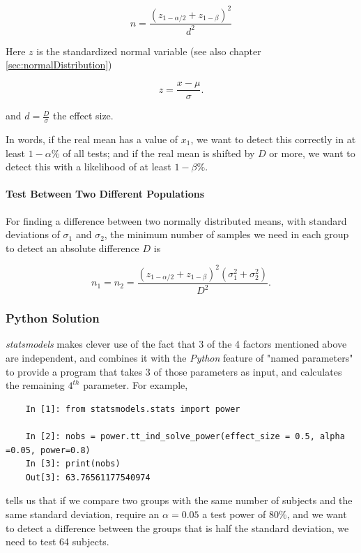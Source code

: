 \begin{equation}
  n = \frac{{({z_{1 - \alpha /2}} + {z_{1 - \beta }})}^2}{d^2}
\end{equation}

Here $z$ is the standardized normal variable (see also chapter \ref{sec:normalDistribution})

\begin{equation}
  z = \frac{x-\mu}{\sigma} .
\end{equation}

and $d = \frac{D}{\sigma}$ the effect size.

In words, if the real mean has a value of $x_1$, we want to detect this correctly in at least $1-\alpha\%$ of all tests; and if the real mean is shifted by $D$ or more, we want to detect this with a likelihood of at least $1-\beta\%$.

\paragraph{Test Between Two Different Populations}
For finding a difference between two normally distributed means, with standard deviations of $\sigma_1$ and $\sigma_2$, the minimum number of samples we need in each group to detect an absolute difference $D$ is

\begin{equation}
  {n_1} = {n_2} = \frac{{({z_{1 - \alpha /2}} + {z_{1 - \beta }})}^2(\sigma _1^2 + \sigma _2^2)}{D^2} .
\end{equation}

\subsubsection{Python Solution}

\emph{statsmodels} makes clever use of the fact that 3 of the 4 factors mentioned above are independent, and combines it with the \emph{Python} feature of "named parameters" to provide a program that takes 3 of those parameters as input, and calculates the remaining $4^{th}$ parameter. For example,

\begin{lstlisting}
    In [1]: from statsmodels.stats import power
    
    In [2]: nobs = power.tt_ind_solve_power(effect_size = 0.5, alpha =0.05, power=0.8)
    In [3]: print(nobs)
    Out[3]: 63.76561177540974
\end{lstlisting}

tells us that if we compare two groups with the same number of subjects and the same standard deviation, require an $\alpha=0.05$ a test power of $80\%$, and we want to detect a difference between the groups that is half the standard deviation, we need to test 64 subjects.

